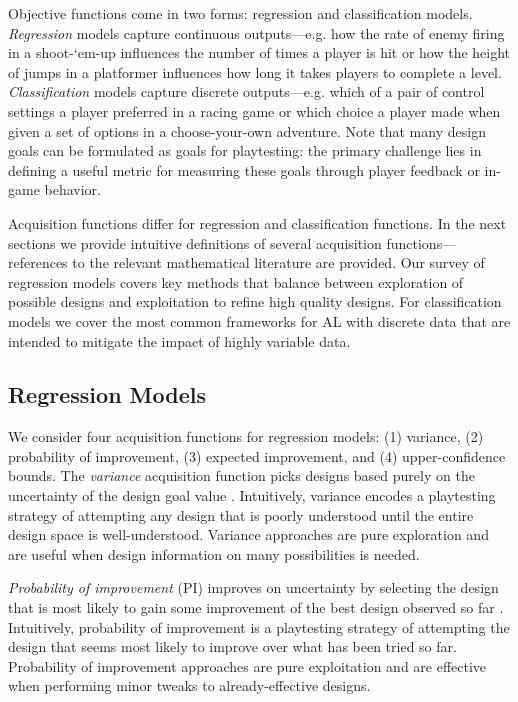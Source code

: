 \documentclass{sig-alternate}
\begin{document}
Objective functions come in two forms: regression and classification models.
\textit{Regression} models capture continuous outputs---e.g. how the rate of enemy firing in a shoot-`em-up influences the number of times a player is hit or how the height of jumps in a platformer influences how long it takes players to complete a level.
\textit{Classification} models capture discrete outputs---e.g. which of a pair of control settings a player preferred in a racing game or which choice a player made when given a set of options in a choose-your-own adventure.
Note that many design goals can be formulated as goals for playtesting: the primary challenge lies in defining a useful metric for measuring these goals through player feedback or in-game behavior.

Acquisition functions differ for regression and classification functions.
In the next sections we provide intuitive definitions of several acquisition functions---references to the relevant mathematical literature are provided.
Our survey of regression models covers key methods that balance between exploration of possible designs and exploitation to refine high quality designs.
For classification models we cover the most common frameworks for AL with discrete data that are intended to mitigate the impact of highly variable data.



\subsection{Regression Models}
We consider four acquisition functions for regression models: (1) variance, (2) probability of improvement, (3) expected improvement, and (4) upper-confidence bounds.
The \textit{variance} acquisition function picks designs based purely on the uncertainty of the design goal value \cite{brochu2010:thesis}.
Intuitively, variance encodes a playtesting strategy of attempting any design that is poorly understood until the entire design space is well-understood.
Variance approaches are pure exploration and are useful when design information on many possibilities is needed.

\textit{Probability of improvement} (PI) improves on uncertainty by selecting the design that is most likely to gain some improvement of the best design observed so far \cite{brochu2010:thesis}. 
Intuitively, probability of improvement is a playtesting strategy of attempting the design that seems most likely to improve over what has been tried so far.
Probability of improvement approaches are pure exploitation and are effective when performing minor tweaks to already-effective designs.
\end{document}
